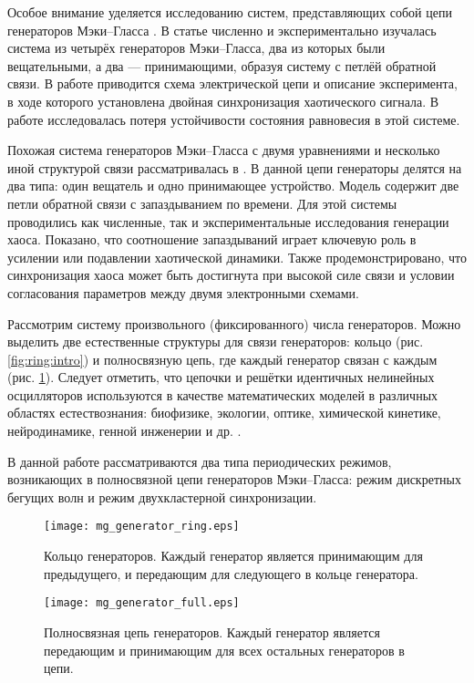 Особое внимание уделяется исследованию систем, представляющих собой цепи генераторов Мэки--Гласса \cite{Preobrazhenskaia2021, Tateno2012, Sano2007, Wan2009}. В статье \cite{Sano2007} численно и экспериментально изучалась система из четырёх генераторов Мэки--Гласса, два из которых были вещательными, а два --- принимающими, образуя систему с петлёй обратной связи. В работе приводится схема электрической цепи и описание эксперимента, в ходе которого установлена двойная синхронизация хаотического сигнала. В работе \cite{Wan2009} исследовалась потеря устойчивости состояния равновесия в этой системе.

Похожая система генераторов Мэки--Гласса с двумя уравнениями и несколько иной структурой связи рассматривалась в \cite{Tateno2012}. В данной цепи генераторы делятся на два типа: один вещатель и одно принимающее устройство. Модель содержит две петли обратной связи с запаздыванием по времени. Для этой системы проводились как численные, так и экспериментальные исследования генерации хаоса. Показано, что соотношение запаздываний играет ключевую роль в усилении или подавлении хаотической динамики. Также продемонстрировано, что синхронизация хаоса может быть достигнута при высокой силе связи и условии согласования параметров между двумя электронными схемами.

Рассмотрим систему произвольного (фиксированного) числа генераторов. Можно выделить две естественные структуры для связи генераторов: кольцо (рис. \ref{fig:ring:intro}) и полносвязную цепь, где каждый генератор связан с каждым (рис. \ref{fig:full_mesh:intro}). Следует отметить, что цепочки и решётки идентичных нелинейных осцилляторов используются в качестве математических моделей в различных областях естествознания: биофизике, экологии, оптике, химической кинетике, нейродинамике, генной инженерии и др. \cite{Goodwin1963}.

В данной работе рассматриваются два типа периодических режимов, возникающих в полносвязной цепи генераторов Мэки--Гласса: режим дискретных бегущих волн и режим двухкластерной синхронизации.

\begin{figure}[ht]
	\begin{minipage}[b]{0.45\linewidth}
		\centering
		\texttt{[image: mg\_generator\_ring.eps]}
		\caption{Кольцо генераторов. Каждый генератор является принимающим для предыдущего, и передающим для следующего в кольце генератора.}
		\label{fig:ring:intro}
	\end{minipage}
	\hspace{0.5cm}
	\begin{minipage}[b]{0.45\linewidth}
		\centering
		\texttt{[image: mg\_generator\_full.eps]}
		\caption{Полносвязная цепь генераторов. Каждый генератор является передающим и принимающим для всех остальных генераторов в цепи.}
		\label{fig:full_mesh:intro}
	\end{minipage}
\end{figure}

